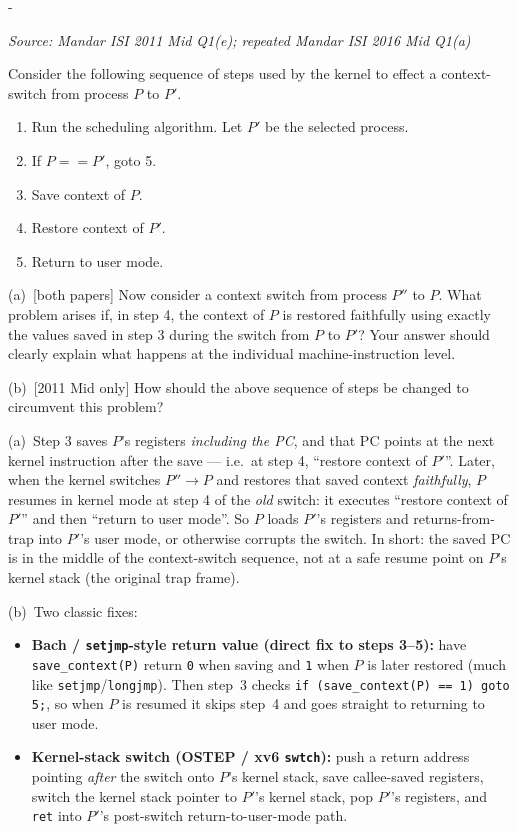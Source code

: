 \documentclass[11pt,a4paper]{article}
\makeatletter
\newcommand{\keepspace}[1]{\par\penalty-100\begingroup
  \setlength{\dimen@}{#1}\dimen@ii\pagegoal\advance\dimen@ii-\pagetotal
  \ifdim\dimen@>\dimen@ii\ifdim\dimen@ii>\z@\vfil\fi\break\fi\endgroup}
\newcounter{qn}[section]
\newenvironment{Qn}[4]{%
  \refstepcounter{qn}\keepspace{7\baselineskip}%
  \begin{tcolorbox}[qboxstyle, title={Q\thesection.\theqn\ \ [#1 \textbar\ #2]\ \ #4}]%
  {\footnotesize\color{g3}\textit{Source: #3}}\par\smallskip%
}{%
  \end{tcolorbox}%
}
\newenvironment{Sol}{%
  \begin{tcolorbox}[sboxstyle, title={Solution}]%
}{%
  \end{tcolorbox}\vspace{0.35em}%
}
\makeatother
\begin{document}
\begin{Qn}{Hard}{Lect 4}{Mandar ISI 2011 Mid Q1(e); repeated Mandar ISI 2016 Mid Q1(a)}{Faithful restore of a saved context is wrong}
Consider the following sequence of steps used by the kernel to effect a context-switch from process $P$ to $P'$.
\begin{enumerate}
  \item Run the scheduling algorithm. Let $P'$ be the selected process.
  \item If $P == P'$, goto 5.
  \item Save context of $P$.
  \item Restore context of $P'$.
  \item Return to user mode.
\end{enumerate}
(a)~[both papers] Now consider a context switch from process $P''$ to $P$. What problem arises if, in step 4, the context of $P$ is restored faithfully using exactly the values saved in step 3 during the switch from $P$ to $P'$? Your answer should clearly explain what happens at the individual machine-instruction level.

(b)~[2011 Mid only] How should the above sequence of steps be changed to circumvent this problem?
\end{Qn}
\begin{Sol}
(a)~Step 3 saves $P$'s registers \emph{including the PC}, and that PC points at the next kernel instruction after the save --- i.e.\ at step 4, ``restore context of $P'$''. Later, when the kernel switches $P''\to P$ and restores that saved context \emph{faithfully}, $P$ resumes in kernel mode at step 4 of the \emph{old} switch: it executes ``restore context of $P'$'' and then ``return to user mode''. So $P$ loads $P'$'s registers and returns-from-trap into $P'$'s user mode, or otherwise corrupts the switch. In short: the saved PC is in the middle of the context-switch sequence, not at a safe resume point on $P$'s kernel stack (the original trap frame).

(b)~Two classic fixes:
\begin{itemize}
  \item \textbf{Bach / \texttt{setjmp}-style return value (direct fix to steps 3--5):} have \texttt{save\_context(P)} return \texttt{0} when saving and \texttt{1} when $P$ is later restored (much like \texttt{setjmp}/\texttt{longjmp}). Then step~3 checks \texttt{if (save\_context(P) == 1) goto 5;}, so when $P$ is resumed it skips step~4 and goes straight to returning to user mode.
  \item \textbf{Kernel-stack switch (OSTEP / xv6 \texttt{swtch}):} push a return address pointing \emph{after} the switch onto $P$'s kernel stack, save callee-saved registers, switch the kernel stack pointer to $P'$'s kernel stack, pop $P'$'s registers, and \texttt{ret} into $P'$'s post-switch return-to-user-mode path.
\end{itemize}
\end{Sol}
\end{document}
